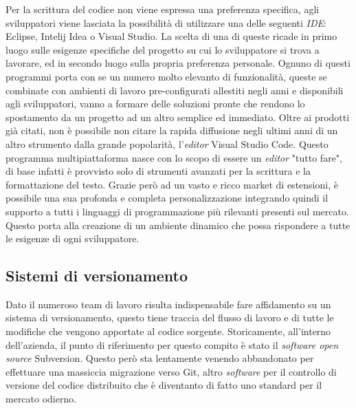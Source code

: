 Per la scrittura del codice non viene espressa una preferenza specifica, agli sviluppatori viene lasciata la possibilità di utilizzare una delle seguenti
\emph{IDE}: Eclipse, Intelij Idea o Visual Studio. La scelta di una di queste ricade in primo luogo sulle esigenze specifiche del progetto su cui lo
sviluppatore si trova a lavorare, ed in secondo luogo sulla propria preferenza personale. Ognuno di questi programmi porta con se un numero molto elevanto
di funzionalità, queste se combinate con ambienti di lavoro pre-configurati allestiti negli anni e disponibili agli sviluppatori, vanno a formare delle
soluzioni pronte che rendono lo spostamento da un progetto ad un altro semplice ed immediato.
Oltre ai prodotti già citati, non è possibile non citare la rapida diffusione negli ultimi anni di un altro strumento dalla grande popolarità, 
l'\emph{editor} Visual Studio Code. 
Questo programma multipiattaforma nasce con lo scopo di essere un \emph{editor} "tutto fare",
di base infatti è provvisto solo di strumenti avanzati per la scrittura e la formattazione del testo. Grazie però ad un vasto e ricco market di estensioni,
è possibile una sua profonda e completa personalizzazione integrando quindi il supporto a tutti i linguaggi di programmazione più rilevanti presenti sul
mercato. Questo porta alla creazione di un ambiente dinamico che possa rispondere a tutte le esigenze di ogni sviluppatore.

\subsection{Sistemi di versionamento}

Dato il numeroso team di lavoro risulta indispensabile fare affidamento su un sistema di versionamento, questo tiene traccia del flusso 
di lavoro e di tutte le modifiche che vengono apportate al codice sorgente. Storicamente, all'interno dell'azienda, il punto di riferimento per questo
compito è stato il \emph{software open source} Subversion. Questo però sta lentamente venendo abbandonato per effettuare una massiccia migrazione
verso Git, altro \emph{software} per il controllo di versione del codice distribuito che è diventanto di fatto uno standard per il mercato odierno.

